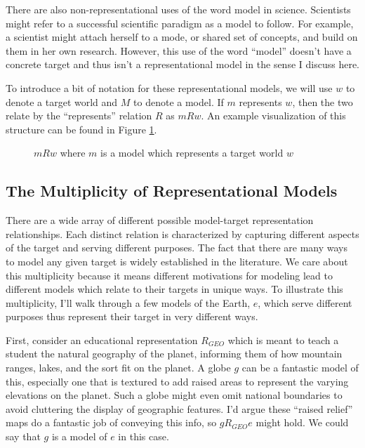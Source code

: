 There are also non-representational uses of the word model in science.
Scientists might refer to a successful scientific paradigm as a model to
follow. For example, a scientist might attach herself to a mode, or
shared set of concepts, and build on them in her own research. However,
this use of the word ``model'' doesn't have a concrete target and thus
isn't a representational model in the sense I discuss here.

To introduce a bit of notation for these representational models, we
will use \(w\) to denote a target world and \(M\) to denote a model. If
\(m\) represents \(w\), then the two relate by the ``represents''
relation \(R\) as \(mRw\). An example visualization of this structure
can be found in Figure \ref{fig:represent}.

\begin{figure}
    \centering
    \caption{$mRw$ where $m$ is a model which represents a target world $w$}
    \label{fig:represent}
\end{figure}

\hypertarget{the-multiplicity-of-representational-models}{%
\subsection{The Multiplicity of Representational
Models}\label{the-multiplicity-of-representational-models}}

There are a wide array of different possible model-target representation
relationships. Each distinct relation is characterized by capturing
different aspects of the target and serving different purposes. The fact
that there are many ways to model any given target is widely established
in the literature. We care about this multiplicity because it means
different motivations for modeling lead to different models which relate
to their targets in unique ways. To illustrate this multiplicity, I'll
walk through a few models of the Earth, \(e\), which serve different
purposes thus represent their target in very different ways.

First, consider an educational representation \(R_{GEO}\) which is meant
to teach a student the natural geography of the planet, informing them
of how mountain ranges, lakes, and the sort fit on the planet. A globe
\(g\) can be a fantastic model of this, especially one that is textured
to add raised areas to represent the varying elevations on the planet.
Such a globe might even omit national boundaries to avoid cluttering the
display of geographic features. I'd argue these ``raised relief'' maps
do a fantastic job of conveying this info, so \(gR_{GEO}e\) might hold.
We could say that \(g\) is a model of \(e\) in this case.


